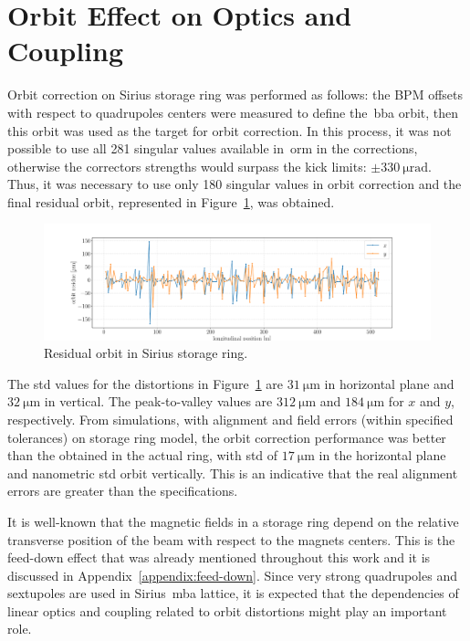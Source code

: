 \section{Orbit Effect on Optics and Coupling}\label{sec:orbit_effect}
Orbit correction on Sirius storage ring was performed as follows: the BPM offsets with respect to quadrupoles centers were measured to define the~\gls{bba} orbit, then this orbit was used as the target for orbit correction. In this process, it was not possible to use all 281 singular values available in~\gls{orm} in the corrections, otherwise the correctors strengths would surpass the kick limits: $\pm \SI{330}{\micro\radian}$. Thus, it was necessary to use only 180 singular values in orbit correction and the final residual orbit, represented in Figure~\ref{fig:orbit_residue}, was obtained.
\begin{figure}
\centering
\includegraphics[width=1.0\textwidth]{figures/orbit_residue.pdf}
\caption{Residual orbit in Sirius storage ring.}
\label{fig:orbit_residue}
\end{figure}

The std values for the distortions in Figure~\ref{fig:orbit_residue} are $\SI{31}{\micro\meter}$ in horizontal plane and $\SI{32}{\micro\meter}$ in vertical. The peak-to-valley values are $\SI{312}{\micro\meter}$ and $\SI{184}{\micro\meter}$ for $x$ and $y$, respectively. From simulations, with alignment and field errors (within specified tolerances) on storage ring model, the orbit correction performance was better than the obtained in the actual ring, with std of $\SI{17}{\micro\meter}$ in the horizontal plane and nanometric std orbit vertically. This is an indicative that the real alignment errors are greater than the specifications.

It is well-known that the magnetic fields in a storage ring depend on the relative transverse position of the beam with respect to the magnets centers. This is the feed-down effect that was already mentioned throughout this work and it is discussed in Appendix~\ref{appendix:feed-down}. Since very strong quadrupoles and sextupoles are used in Sirius~\gls{mba} lattice, it is expected that the dependencies of linear optics and coupling related to orbit distortions might play an important role.

